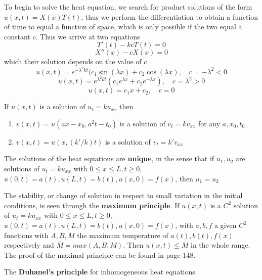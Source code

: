 \documentclass[12pt]{paper}
\begin{document}
To begin to solve the heat equation, we search for product solutions of the form $u(x,t)=X(x)T(t)$, thus we perform the differentiation to obtain a function of time to equal a function of space, which is only possible if the two equal a constant $c$. Thus we arrive at two equations
\begin{equation*}
T'(t)-kcT(t)=0
\end{equation*}
\begin{equation*}
X''(x)-cX(x)=0
\end{equation*}
which their solution depends on the value of $c$
\begin{equation*}
u(x,t)=e^{-\lambda^2kt}(c_1\sin(\lambda x)+c_2\cos(\lambda x) ,\quad c=-\lambda^2<0
\end{equation*}
\begin{equation*}
u(x,t)=e^{\lambda^2 kt}(c_1e^{\lambda x}+c_2e^{-\lambda x}),\quad c=\lambda^2 >0
\end{equation*}
\begin{equation*}
u(x,t)=c_1x+c_2, \quad c=0
\end{equation*}

If $u(x,t)$ is a solution of $u_t = ku_{xx}$ then
\begin{enumerate}
\item  $v(x,t)=u(ax-x_0,a^2t-t_0)$ is a solution of $v_t=kv_{xx}$ for any $a,x_0,t_0$
\item $v(x,t)=u(x,(k'/k)t)$ is a solution of $v_t=k'v_{xx}$
\end{enumerate}

The solutions of the heat equations are \textbf{unique}, in the sense that if $u_1,u_2$ are solutions of $u_t=ku_{xx}$ with $0\leq x\leq L, t\geq 0$, $u(0,t)=a(t), u(L,t)= b(t), u(x,0) = f(x)$, then $u_1=u_2$ 

The stability, or change of solution in respect to small variation in the initial conditions, is seen through the \textbf{maximum principle}. If $u(x,t)$ is a $C^2$ solution of $u_t=ku_{xx}$ with $0\leq x\leq L, t\geq 0$, $u(0,t)=a(t), u(L,t) = b(t), u(x,0) = f(x)$, with $a,b,f$ a given $C^2$ functions with $A,B,M$ the maximum temperature of $a(t),b(t),f(x)$ respectively and $\bar{M}=max(A,B,M)$. Then $u(x,t)\leq \bar{M}$ in the whole range. 
The proof of the maximal principle can be found in \cite{bleecker1992basic} page 148.

The \textbf{Duhanel's principle} for inhomogeneous heat equations



\end{document}
